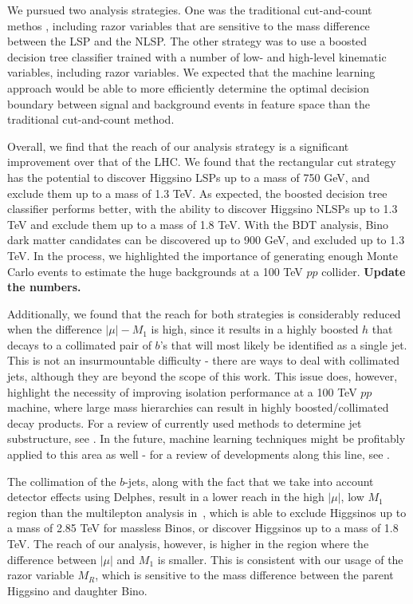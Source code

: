 \documentclass[a4paper,11pt]{article}
\newcommand{\Shufang}[1]{{\bf\color{Maroon}  #1}}
\begin{document}
We pursued two analysis strategies. One was the traditional cut-and-count methos , including razor variables
that are sensitive to the mass difference between the LSP and the NLSP. The
other strategy was to use a boosted decision tree classifier trained with a
number of low- and high-level kinematic variables, including razor variables. We expected
that the machine learning approach would be able to more efficiently determine
the optimal decision boundary between signal and background events in feature
space than the traditional   cut-and-count method.

Overall, we find that the reach of our analysis strategy is a significant
improvement over that of the LHC.    We found that the rectangular cut strategy has
the potential to discover Higgsino LSPs up to a mass of 750 GeV, and exclude
them up to a mass of 1.3 TeV. As expected, the boosted decision tree classifier
performs better, with the ability to discover Higgsino NLSPs up to 1.3 TeV and
exclude them up to a mass of 1.8 TeV. With the BDT analysis, Bino dark matter
candidates can be discovered up to 900 GeV, and excluded up to 1.3 TeV. In the
process, we highlighted the importance of generating enough Monte Carlo events
to estimate the huge backgrounds at a 100 TeV $pp$ collider.  \Shufang{Update the numbers.}

Additionally, we found that the reach for both strategies is considerably
reduced when the difference $ |\mu|-M_1$ is high, since it results in a highly
boosted $h$ that decays to a collimated pair of $b$'s that will most likely be
identified as a single jet. This is not an insurmountable difficulty - there are
ways to deal with collimated jets, although they are beyond the scope of this
work. This issue does, however, highlight the necessity of improving isolation
performance at a 100 TeV $pp$ machine, where large mass hierarchies can result in
highly boosted/collimated decay products. For a review of currently used methods
to determine jet substructure, see \citep{Shelton:2013an}. In the future,
machine learning techniques might be profitably applied to this area as well -
for a review of developments along this line, see \citep{Schwartzman:2016jqu}. 

The collimation of the $b$-jets, along with the fact that we take into account
detector effects using Delphes, result in a lower reach in the high $|\mu|$, low
$M_1$ region than the multilepton analysis in~\citep{Gori:2014oua}, which is
able to exclude Higgsinos up to a mass of 2.85 TeV for massless Binos, or discover Higgsinos up to a mass of 1.8 TeV.   The reach
of our analysis, however,  is higher in the region where the difference between
$|\mu|$ and $M_1$ is smaller. This is consistent with our usage of the razor
variable $M_R$, which is sensitive to the mass difference between the parent
Higgsino and daughter Bino.
\end{document}
